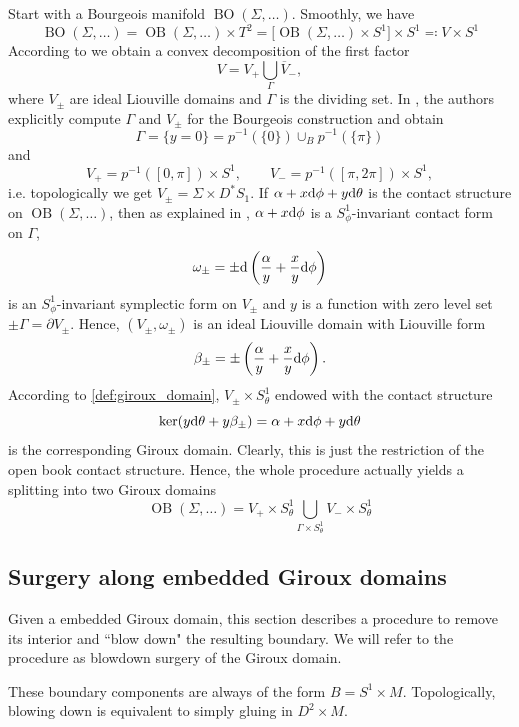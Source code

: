 Start with a Bourgeois manifold $\operatorname{BO}(\Sigma,\dots)$.
Smoothly, we have
\[
    \operatorname{BO}(\Sigma,\dots) = \operatorname{OB}(\Sigma, \dots) \times T^2 
    = \big[\operatorname{OB}(\Sigma, \dots) \times S^1\big] \times S^1 
    \eqqcolon V \times S^1
\]
According to \cite[Section 6]{DG12} we obtain a convex decomposition of the first factor
\[
    V = V_+ \bigcup_\Gamma \overline{V}_-,
\]
where $V_\pm$ are ideal Liouville domains and $\Gamma$ is the dividing set.
In \cite[Section 5.3]{DG12}, the authors explicitly compute $\Gamma$ and 
$V_\pm$ for the Bourgeois construction and obtain %
\[
    \Gamma = \{y = 0\} = p^{-1}(\{0\}) \cup_B p^{-1}(\{\pi\})
\]
and
\[
    V_+ = p^{-1}([0, \pi]) \times S^1, \qquad V_- = p^{-1}([\pi, 2\pi]) \times S^1,
\]
i.e. topologically we get $V_\pm = \Sigma \times D^*S_1$.
If $\alpha + x \mathrm{d} \phi + y \mathrm{d} \theta$ is the contact structure on $\operatorname{OB}(\Sigma, \dots)$,
then as explained in \cite[Section 5.3]{DG12}, $\alpha + x \mathrm{d} \phi$ is a 
$S^1_\phi$-invariant contact form on $\Gamma$,
\[
    \omega_\pm = \pm \mathrm{d} \left(\frac{\alpha}{y} + \frac{x}{y}\mathrm{d} \phi\right) 
\]
is an $S^1_\phi$-invariant symplectic form on $V_\pm$ and
$y$ is a function with zero level set $\pm \Gamma = \partial V_\pm$.
Hence, $(V_\pm, \omega_\pm)$ is an ideal Liouville domain with Liouville form
\[
    \beta_\pm = \pm \left(\frac{\alpha}{y} + \frac{x}{y}\mathrm{d} \phi\right).
\]
According to \cref{def:giroux_domain}, $V_\pm \times S^1_\theta$
endowed with the contact structure 
\[
    \ker(y \mathrm{d} \theta + y \beta_\pm) = \alpha + x \mathrm{d} \phi + y \mathrm{d} \theta
\]
is the corresponding Giroux domain. Clearly, this is just the restriction
of the open book contact structure. Hence, the whole procedure actually yields a
splitting into two Giroux domains
\[
    \operatorname{OB}(\Sigma, \dots) = V_+ \times S^1_\theta 
    \bigcup_{\Gamma \times S^1_\theta} V_- \times S^1_\theta
\]

\subsection*{Surgery along embedded Giroux domains}
Given a embedded Giroux domain, this section describes a procedure
to remove its interior and ``blow down" the resulting boundary.
We will refer to the procedure as blowdown surgery of the Giroux domain.

These boundary components are always of the form $B = S^1 \times M$.
Topologically, blowing down is equivalent to simply gluing in $D^2 \times M$.

